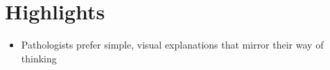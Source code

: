 \section*{\textbf{Highlights}}

\begin{itemize}
    \item Pathologists prefer simple, visual explanations that mirror their way of thinking
\end{itemize}
